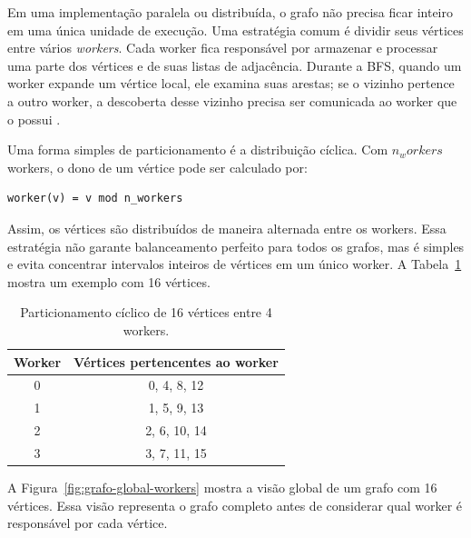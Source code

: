\documentclass{article}
\begin{document}
Em uma implementação paralela ou distribuída, o grafo não precisa ficar inteiro
em uma única unidade de execução. Uma estratégia comum é dividir seus vértices entre vários
\textit{workers}. Cada worker fica responsável por armazenar e processar uma
parte dos vértices e de suas listas de adjacência. Durante a BFS, quando um
worker expande um vértice local, ele examina suas arestas; se o vizinho pertence
a outro worker, a descoberta desse vizinho precisa ser comunicada ao worker que
o possui \cite{merrillgpu}.

Uma forma simples de particionamento é a distribuição cíclica. Com $n_workers$
workers, o dono de um vértice pode ser calculado por:

\begin{lstlisting}
worker(v) = v mod n_workers
\end{lstlisting}

Assim, os vértices são distribuídos de maneira alternada entre os workers. Essa
estratégia não garante balanceamento perfeito para todos os grafos, mas é simples
e evita concentrar intervalos inteiros de vértices em um único worker. A
Tabela~\ref{tab:worker-partition} mostra um exemplo com 16 vértices.

\begin{table}[H]
\centering
\begin{tabular}{c|c}
Worker & Vértices pertencentes ao worker \\
\hline
0 & 0, 4, 8, 12 \\
1 & 1, 5, 9, 13 \\
2 & 2, 6, 10, 14 \\
3 & 3, 7, 11, 15 \\
\end{tabular}
\caption{Particionamento cíclico de 16 vértices entre 4 workers.}
\label{tab:worker-partition}
\end{table}

A Figura~\ref{fig:grafo-global-workers} mostra a visão global de um grafo com 16
vértices. Essa visão representa o grafo completo antes de considerar qual worker
é responsável por cada vértice.
\end{document}
